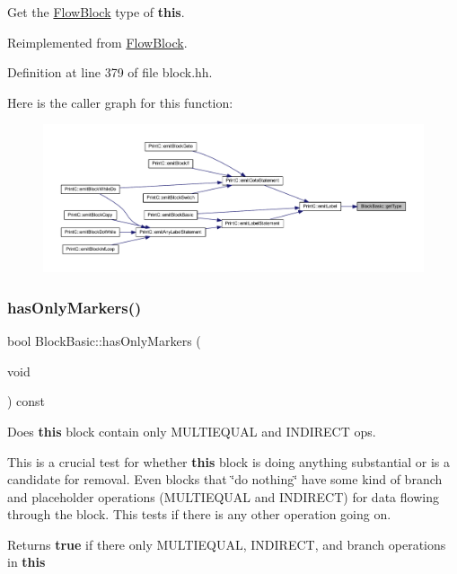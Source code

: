 Get the \mbox{\hyperlink{class_flow_block}{Flow\+Block}} type of {\bfseries{this}}. 



Reimplemented from \mbox{\hyperlink{class_flow_block_ae036068cc610d97a5461f9bcf75bd43d}{Flow\+Block}}.



Definition at line 379 of file block.\+hh.

Here is the caller graph for this function\+:
\nopagebreak
\begin{figure}[H]
\begin{center}
\leavevmode
\includegraphics[width=350pt]{class_block_basic_aeb3a61f4e372495d0644f56c5c20f974_icgraph}
\end{center}
\end{figure}
\mbox{\label{class_block_basic_a889777af9024df726d21540187277edd}} 
\subsubsection{\texorpdfstring{hasOnlyMarkers()}{hasOnlyMarkers()}}
{\footnotesize\ttfamily bool Block\+Basic\+::has\+Only\+Markers (\begin{DoxyParamCaption}\item[{void}]{ }\end{DoxyParamCaption}) const}



Does {\bfseries{this}} block contain only M\+U\+L\+T\+I\+E\+Q\+U\+AL and I\+N\+D\+I\+R\+E\+CT ops. 

This is a crucial test for whether {\bfseries{this}} block is doing anything substantial or is a candidate for removal. Even blocks that \char`\"{}do nothing\char`\"{} have some kind of branch and placeholder operations (M\+U\+L\+T\+I\+E\+Q\+U\+AL and I\+N\+D\+I\+R\+E\+CT) for data flowing through the block. This tests if there is any other operation going on. \begin{DoxyReturn}{Returns}
{\bfseries{true}} if there only M\+U\+L\+T\+I\+E\+Q\+U\+AL, I\+N\+D\+I\+R\+E\+CT, and branch operations in {\bfseries{this}} 
\end{DoxyReturn}


